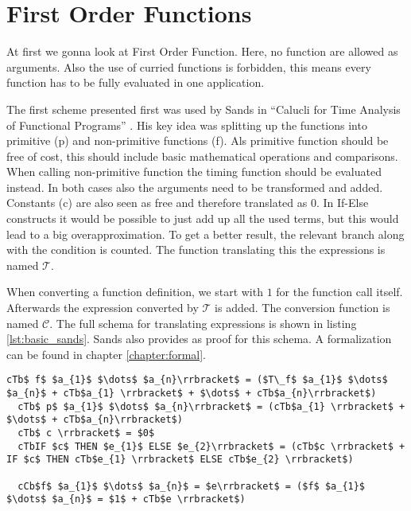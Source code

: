 
\section{First Order Functions}

At first we gonna look at First Order Function.
Here, no function are allowed as arguments.
Also the use of curried functions is forbidden, this means every function has to be fully evaluated in one application.

The first scheme presented first was used by Sands in ``Calucli for Time Analysis of Functional Programs'' \parencite{sands}.
His key idea was splitting up the functions into primitive (p) and non-primitive functions (f).
Als primitive function should be free of cost, this should include basic mathematical operations and comparisons.
When calling non-primitive function the timing function should be evaluated instead.
In both cases also the arguments need to be transformed and added.
Constants (c) are also seen as free and therefore translated as 0.
In If-Else constructs it would be possible to just add up all the used terms,
but this would lead to a big overapproximation.
To get a better result, the relevant branch along with the condition is counted.
The function translating this the expressions is named $\mathcal{T}$.

When converting a function definition, we start with $1$ for the function call itself.
Afterwards the expression converted by $\mathcal{T}$ is added.
The conversion function is named $\mathcal{C}$.
The full schema for translating expressions is shown in listing \ref{lst:basic_sands}.
Sands also provides as proof for this schema. A formalization can be found in chapter \ref{chapter:formal}.

\begin{lstlisting}[language=translation,label=lst:basic_sands,caption=Translation schema for first order functions by Sands,mathescape=true]
  cTb$ f$ $a_{1}$ $\dots$ $a_{n}\rrbracket$ = ($T\_f$ $a_{1}$ $\dots$ $a_{n}$ + cTb$a_{1} \rrbracket$ + $\dots$ + cTb$a_{n}\rrbracket$)
  cTb$ p$ $a_{1}$ $\dots$ $a_{n}\rrbracket$ = (cTb$a_{1} \rrbracket$ + $\dots$ + cTb$a_{n}\rrbracket$)
  cTb$ c \rrbracket$ = $0$
  cTbIF $c$ THEN $e_{1}$ ELSE $e_{2}\rrbracket$ = (cTb$c \rrbracket$ + IF $c$ THEN cTb$e_{1} \rrbracket$ ELSE cTb$e_{2} \rrbracket$)

  cCb$f$ $a_{1}$ $\dots$ $a_{n}$ = $e\rrbracket$ = ($f$ $a_{1}$ $\dots$ $a_{n}$ = $1$ + cTb$e \rrbracket$)
\end{lstlisting}

